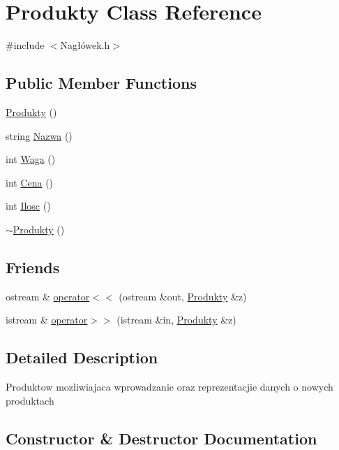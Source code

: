 \hypertarget{class_produkty}{}\section{Produkty Class Reference}
\label{class_produkty}


{\ttfamily \#include $<$Nagłówek.\+h$>$}

\subsection*{Public Member Functions}
\begin{DoxyCompactItemize}
\item 
\mbox{\hyperlink{class_produkty_a16b6d9a62ef9cfb90c6b80744945f885}{Produkty}} ()
\item 
string \mbox{\hyperlink{class_produkty_aa7494624bb7e21ebe813cd3006ec2274}{Nazwa}} ()
\item 
int \mbox{\hyperlink{class_produkty_a4ecb609419d9b3f25cf2eecbcacceaa7}{Waga}} ()
\item 
int \mbox{\hyperlink{class_produkty_a72fb87d97714d084955c12d6341a376d}{Cena}} ()
\item 
int \mbox{\hyperlink{class_produkty_a0a20cd05ba8aa6a2665a57cc74a2743c}{Ilosc}} ()
\item 
\mbox{\hyperlink{class_produkty_a9da830cebdf28e5eebf61590d9d8c0d9}{$\sim$\+Produkty}} ()
\end{DoxyCompactItemize}
\subsection*{Friends}
\begin{DoxyCompactItemize}
\item 
ostream \& \mbox{\hyperlink{class_produkty_a77a78a1dde173eb856628a786d2ca4cc}{operator$<$$<$}} (ostream \&out, \mbox{\hyperlink{class_produkty}{Produkty}} \&z)
\item 
istream \& \mbox{\hyperlink{class_produkty_a66e8098f742269822c07dd1641d419fe}{operator$>$$>$}} (istream \&in, \mbox{\hyperlink{class_produkty}{Produkty}} \&z)
\end{DoxyCompactItemize}


\subsection{Detailed Description}
Produktow mozliwiajaca wprowadzanie oraz reprezentacjie danych o nowych produktach 

\subsection{Constructor \& Destructor Documentation}
\mbox{\label{class_produkty_a16b6d9a62ef9cfb90c6b80744945f885}} 
